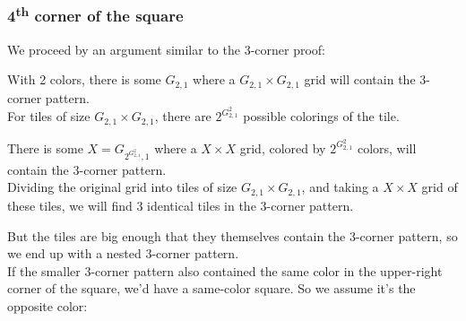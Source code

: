 \documentclass[11pt]{article}
\newcommand*{\scalePic}{0.4}
\newcommand{\echoWithinShell}[1]{ ( echo \\\\\\\\begin\\{lstlisting\\}\\[breaklines\\] && echo #1 && echo \\\\\\\\end\\{lstlisting\\} ) }
\newcommand{\shellRun}[2] {%
   && \echoWithinShell{\\ #1} && \echoWithinShell{\\ $OUTPUT} ) }%
}
\newcommand{\cppRun}[2]{%
  \shellRun{#1 #2}{run}
}
\begin{document}
\pagebreak
\subsubsection*{4\textsuperscript{th} corner of the square}

We proceed by an argument similar to the 3-corner proof:
\begin{center}
\end{center}

With 2 colors, there is some $G_{2,1}$ where a $G_{2,1} \times G_{2,1}$ grid will contain the 3-corner pattern.\\
For tiles of size $G_{2,1} \times G_{2,1}$, there are $2^{G_{2,1}^2}$ possible colorings of the tile.

There is some $X=G_{2^{G_{2,1}^2},1}$ where a $X \times X$ grid, colored by $2^{G_{2,1}^2}$ colors, will contain the 3-corner pattern.\\
Dividing the original grid into tiles of size $G_{2,1} \times G_{2,1}$, and taking a $X \times X$ grid of these tiles, we will find 3 identical tiles in the 3-corner pattern.

But the tiles are big enough that they themselves contain the 3-corner pattern, so we end up with a nested 3-corner pattern.\\
If the smaller 3-corner pattern also contained the same color in the upper-right corner of the square, we'd have a same-color square. So we assume it's the opposite color:
\begin{center}
\end{center}
\end{document}
